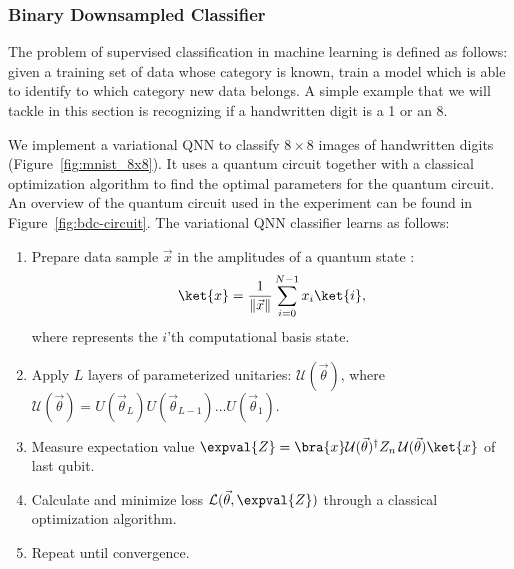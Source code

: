 \documentclass[a4paper,10pt]{article}
\begin{document}
\subsubsection{Binary Downsampled Classifier} \label{sec:bdc}
The problem of supervised classification in machine learning is defined as follows: given a training set of data whose category is known, train a model which is able to identify to which category new data belongs.
A simple example that we will tackle in this section is recognizing if a handwritten digit is a 1 or an 8.

We implement a variational QNN to classify $8 \times 8$ images of handwritten digits (Figure~\ref{fig:mnist_8x8}).
It uses a quantum circuit together with a classical optimization algorithm to find the optimal parameters for the quantum circuit.
An overview of the quantum circuit used in the experiment can be found in Figure~\ref{fig:bdc-circuit}.
The variational QNN classifier learns as follows:
\begin{enumerate}
	\item Prepare data sample $\vec{x}$ in the amplitudes of a quantum state :
	\begin{equation}
	 \ket{x} = \dfrac{1}{\lVert\vec{x}\rVert}\sum_{i=0}^{N-1} x_i\ket{i},
	\end{equation}
	where  represents the $i$'th computational basis state.
	\item Apply $L$ layers of parameterized unitaries: $\mathcal{U}(\vec{\theta})$, where $\mathcal{U}(\vec{\theta}) = U(\vec{\theta}_L) U(\vec{\theta}_{L-1}) \ldots U(\vec{\theta}_1)$.
	\item Measure expectation value $\expval{Z} = \bra{x}\mathcal{U}(\vec{\theta})^\dagger Z_n\, \mathcal{U}(\vec{\theta})\ket{x}$ of last qubit.
	\item Calculate and minimize loss $\mathcal{L}(\vec{\theta}, \expval{Z})$ through a classical optimization algorithm.
	\item Repeat until convergence.
\end{enumerate}
\end{document}
